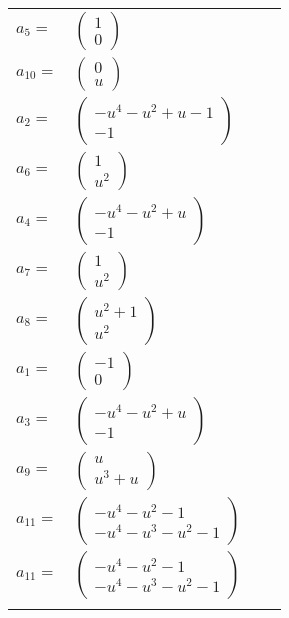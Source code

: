 \documentclass[1p]{elsarticle_modified}
\theoremstyle{definition}
\begin{document}
\begin{tabular}{m{7pt} m{180pt} m{7pt} m{180pt} }
\flushright $a_{5}=$&$\begin{pmatrix}1\\0\end{pmatrix}$ \\
\flushright $a_{10}=$&$\begin{pmatrix}0\\u\end{pmatrix}$ \\
\flushright $a_{2}=$&$\begin{pmatrix}- u^4- u^2+u-1\\-1\end{pmatrix}$ \\
\flushright $a_{6}=$&$\begin{pmatrix}1\\u^2\end{pmatrix}$ \\
\flushright $a_{4}=$&$\begin{pmatrix}- u^4- u^2+u\\-1\end{pmatrix}$ \\
\flushright $a_{7}=$&$\begin{pmatrix}1\\u^2\end{pmatrix}$ \\
\flushright $a_{8}=$&$\begin{pmatrix}u^2+1\\u^2\end{pmatrix}$ \\
\flushright $a_{1}=$&$\begin{pmatrix}-1\\0\end{pmatrix}$ \\
\flushright $a_{3}=$&$\begin{pmatrix}- u^4- u^2+u\\-1\end{pmatrix}$ \\
\flushright $a_{9}=$&$\begin{pmatrix}u\\u^3+u\end{pmatrix}$ \\
\flushright $a_{11}=$&$\begin{pmatrix}- u^4- u^2-1\\- u^4- u^3- u^2-1\end{pmatrix}$\\ \flushright $a_{11}=$&$\begin{pmatrix}- u^4- u^2-1\\- u^4- u^3- u^2-1\end{pmatrix}$\\&\end{tabular}
\end{document}
